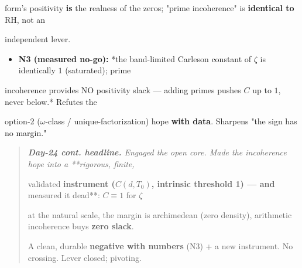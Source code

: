 \documentclass[10pt]{article}
\begin{document}
  form's positivity \textbf{is} the realness of the zeros; "prime incoherence" is \textbf{identical to} RH, not an\par
  independent lever.\par
\begin{itemize}
\item \textbf{N3 (measured no-go):} *the band-limited Carleson constant of $\zeta$ is identically $1$ (saturated); prime
\end{itemize}
  incoherence provides NO positivity slack --- adding primes pushes $C$ up to $1$, never below.* Refutes the\par
  option-2 ($\omega$-class / unique-factorization) hope \textbf{with data}. Sharpens "the sign has no margin."\par

\begin{quote}\itshape
\textbf{Day-24 cont. headline.} Engaged the open core. Made the incoherence hope into a **rigorous, finite,\par
validated\textbf{ instrument ($C(d,T_0)$, intrinsic threshold 1) --- and }measured it dead**: $C\equiv1$ for $\zeta$\par
at the natural scale, the margin is archimedean (zero density), arithmetic incoherence buys \textbf{zero slack}.\par
A clean, durable \textbf{negative with numbers} (N3) + a new instrument. No crossing. Lever closed; pivoting.\par
\end{quote}
\end{document}
